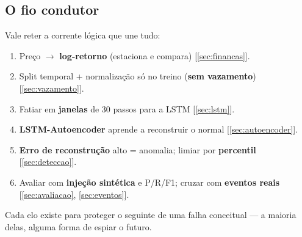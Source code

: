 \subsection{O fio condutor}
Vale reter a corrente lógica que une tudo:
\begin{enumerate}[noitemsep]
  \item Preço $\to$ \textbf{log-retorno} (estaciona e compara) [\ref{sec:financas}].
  \item Split temporal + normalização só no treino (\textbf{sem vazamento})
        [\ref{sec:vazamento}].
  \item Fatiar em \textbf{janelas} de 30 passos para a LSTM [\ref{sec:lstm}].
  \item \textbf{LSTM-Autoencoder} aprende a reconstruir o normal
        [\ref{sec:autoencoder}].
  \item \textbf{Erro de reconstrução} alto = anomalia; limiar por
        \textbf{percentil} [\ref{sec:deteccao}].
  \item Avaliar com \textbf{injeção sintética} e P/R/F1; cruzar com
        \textbf{eventos reais} [\ref{sec:avaliacao}, \ref{sec:eventos}].
\end{enumerate}
Cada elo existe para proteger o seguinte de uma falha conceitual --- a maioria
delas, alguma forma de espiar o futuro.
